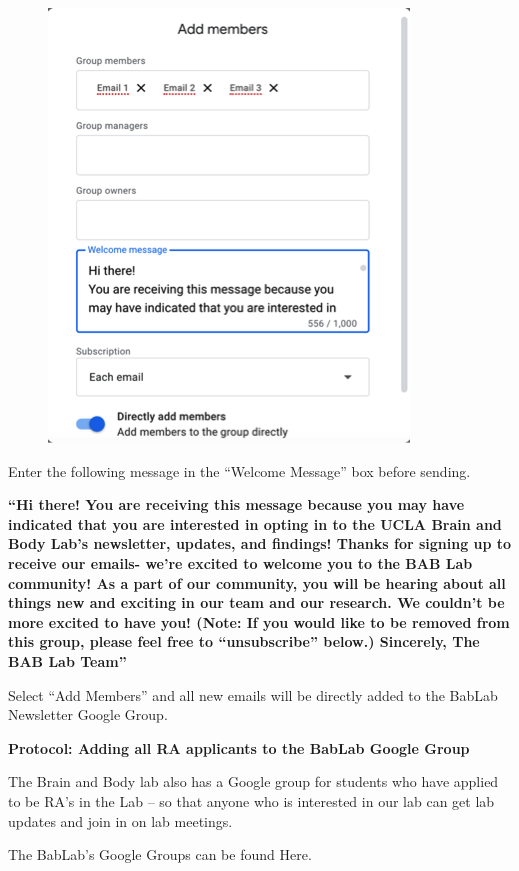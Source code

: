 \documentclass[]{book}
\begin{document}
\begin{figure}
\centering
\includegraphics{images/lab_protocols/listserv/listserv_3.png}
\caption{}
\end{figure}

Enter the following message in the ``Welcome Message'' box before sending.

\textbf{``Hi there!
You are receiving this message because you may have indicated that you are interested in opting in to the UCLA Brain and Body Lab's newsletter, updates, and findings! Thanks for signing up to receive our emails- we're excited to welcome you to the BAB Lab community! As a part of our community, you will be hearing about all things new and exciting in our team and our research. We couldn't be more excited to have you! (Note: If you would like to be removed from this group, please feel free to ``unsubscribe'' below.)
Sincerely,
The BAB Lab Team''}

Select ``Add Members'' and all new emails will be directly added to the BabLab Newsletter Google Group.

\textbf{Protocol: Adding all RA applicants to the BabLab Google Group}

The Brain and Body lab also has a Google group for students who have applied to be RA's in the Lab -- so that anyone who is interested in our lab can get lab updates and join in on lab meetings.

The BabLab's Google Groups can be found Here.
\end{document}
